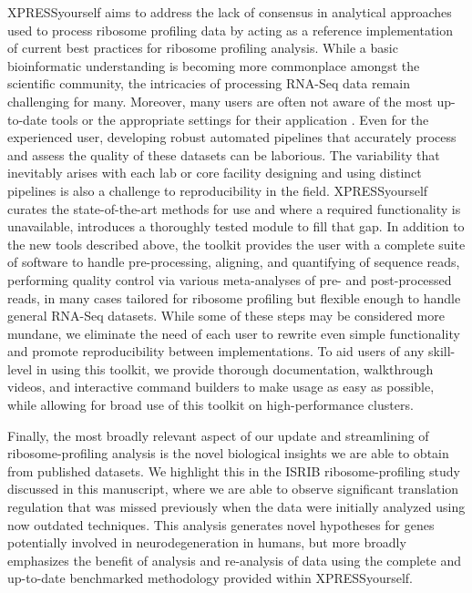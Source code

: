 \documentclass[10pt, oneside]{article}
\begin{document}
XPRESSyourself aims to address the lack of consensus in analytical approaches used to process ribosome profiling data by acting as a reference implementation of current best practices for ribosome profiling analysis. While a basic bioinformatic understanding is becoming more commonplace amongst the scientific community, the intricacies of processing RNA-Seq data remain challenging for many. Moreover, many users are often not aware of the most up-to-date tools or the appropriate settings for their application \cite{costello_npjsba, funari_science}. Even for the experienced user, developing robust automated pipelines that accurately process and assess the quality of these datasets can be laborious. The variability that inevitably arises with each lab or core facility designing and using distinct pipelines is also a challenge to reproducibility in the field. XPRESSyourself curates the state-of-the-art methods for use and where a required functionality is unavailable, introduces a thoroughly tested module to fill that gap. In addition to the new tools described above, the toolkit provides the user with a complete suite of software to handle pre-processing, aligning, and quantifying of sequence reads, performing quality control via various meta-analyses of pre- and post-processed reads, in many cases tailored for ribosome profiling but flexible enough to handle general RNA-Seq datasets. While some of these steps may be considered more mundane, we eliminate the need of each user to rewrite even simple functionality and promote reproducibility between implementations. To aid users of any skill-level in using this toolkit, we provide thorough documentation, walkthrough videos, and interactive command builders to make usage as easy as possible, while allowing for broad use of this toolkit on high-performance clusters.\par

Finally, the most broadly relevant aspect of our update and streamlining of ribosome-profiling analysis is the novel biological insights we are able to obtain from published datasets. We highlight this in the ISRIB ribosome-profiling study discussed in this manuscript, where we are able to observe significant translation regulation that was missed previously when the data were initially analyzed using now outdated techniques. This analysis generates novel hypotheses for genes potentially involved in neurodegeneration in humans, but more broadly emphasizes the benefit of analysis and re-analysis of data using the complete and up-to-date benchmarked methodology provided within XPRESSyourself.\\
\end{document}
